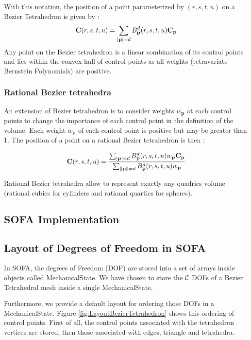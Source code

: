 \documentclass[a4paper,11pt]{article}
\begin{document}
With this notation, the position of a point parameterized by $(r,s,t,u)$ on a Bezier Tetrahedron is given by :
\[
{\mathbf C}(r,s,t,u)=\sum_{|\mathbf p|={d}}  B^d_{\mathbf p}(r,s,t,u) {\mathbf C}_{\mathbf p}
\]
Any point on the Bezier tetrahedron is a linear combination of its control points and lies within the convex hull of control points as all weights (tetravariate Bernstein Polynomials) are positive.


\subsubsection{Rational Bezier tetrahedra}
An extension of Bezier tetrahedron is to consider weights $w_{\mathbf p}$ at each control points to change the importance of each control point in the definition of the volume. Each weight  $w_{\mathbf p}$ of each control point is positive but may be greater than 1. 
The position of a point on a rational Bezier tetrahedron is then :

\[
{\mathbf C}(r,s,t,u)=\frac{\sum_{|\mathbf p|={d}}  B^d_{\mathbf p}(r,s,t,u) w_{\mathbf p} {\mathbf C}_{\mathbf p}}{\sum_{\|\mathbf p\|={d}}  B^d_{\mathbf p}(r,s,t,u) w_{\mathbf p}}
\]

Rational Bezier tetrahedra allow to represent exactly any quadrics volume (rational cubics for cylinders and rational quartics for spheres).



\subsection{SOFA Implementation}

\subsection{Layout of Degrees of Freedom in SOFA}

In SOFA, the degrees of Freedom (DOF) are stored into a set of arrays inside objects called MechanicalState.
We have chosen to store the ${\mathcal C}$ DOFs of a Bezier Tetrahedral mesh inside a single MechanicalState. 

Furthermore, we provide a default layout for ordering those DOFs in a
MechanicalState. 
Figure \ref{fig:LayoutBezierTetrahedron} shows this ordering of control points. First of all, the control points associated with the tetrahedron vertices are stored, then those associated with edges, triangle and tetrahedra.
\end{document}
